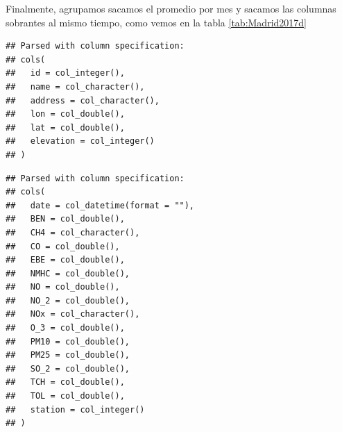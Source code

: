 \documentclass[]{book}
\newenvironment{Shaded}{\begin{snugshade}}{\end{snugshade}}
\newcommand{\DataTypeTok}[1]{\textcolor[rgb]{0.13,0.29,0.53}{#1}}
\newcommand{\DecValTok}[1]{\textcolor[rgb]{0.00,0.00,0.81}{#1}}
\newcommand{\KeywordTok}[1]{\textcolor[rgb]{0.13,0.29,0.53}{\textbf{#1}}}
\newcommand{\NormalTok}[1]{#1}
\newcommand{\OperatorTok}[1]{\textcolor[rgb]{0.81,0.36,0.00}{\textbf{#1}}}
\newcommand{\OtherTok}[1]{\textcolor[rgb]{0.56,0.35,0.01}{#1}}
\newcommand{\StringTok}[1]{\textcolor[rgb]{0.31,0.60,0.02}{#1}}
\begin{document}
Finalmente, agrupamos sacamos el promedio por mes y sacamos las columnas
sobrantes al mismo tiempo, como vemos en la tabla \ref{tab:Madrid2017d}

\begin{Shaded}
\end{Shaded}

\begin{verbatim}
## Parsed with column specification:
## cols(
##   id = col_integer(),
##   name = col_character(),
##   address = col_character(),
##   lon = col_double(),
##   lat = col_double(),
##   elevation = col_integer()
## )
\end{verbatim}

\begin{Shaded}
\end{Shaded}

\begin{verbatim}
## Parsed with column specification:
## cols(
##   date = col_datetime(format = ""),
##   BEN = col_double(),
##   CH4 = col_character(),
##   CO = col_double(),
##   EBE = col_double(),
##   NMHC = col_double(),
##   NO = col_double(),
##   NO_2 = col_double(),
##   NOx = col_character(),
##   O_3 = col_double(),
##   PM10 = col_double(),
##   PM25 = col_double(),
##   SO_2 = col_double(),
##   TCH = col_double(),
##   TOL = col_double(),
##   station = col_integer()
## )
\end{verbatim}
\end{document}

